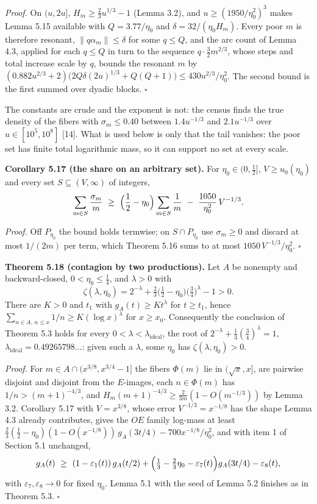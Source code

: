 \documentclass[11pt,a4paper]{article}
\begin{document}
\emph{Proof.} On \((u,2u]\), \(H_m\ge\tfrac23u^{1/3}-1\) (Lemma 3.2),
and \(u\ge(1950/\eta_0^2)^3\) makes Lemma 5.15 available with
\(Q=3.77/\eta_0\) and \(\delta=32/(\eta_0H_m)\). Every poor \(m\) is
therefore resonant, \(\|q\alpha_m\|\le\delta\) for some \(q\le Q\), and
the arc count of Lemma 4.3, applied for each \(q\le Q\) in turn to the
sequence \(q\cdot\tfrac32m^{2/3}\), whose steps and total increase scale
by \(q\), bounds the resonant \(m\) by
\((0.882u^{2/3}+2)\bigl(2Q\delta(2u)^{1/3}+Q(Q+1)\bigr)\le430u^{2/3}/\eta_0^2\).
The second bound is the first summed over dyadic blocks. \(\square\)

The constants are crude and the exponent is not: the census finds the
true density of the fibers with \(\sigma_m\le0.40\) between
\(1.4u^{-1/3}\) and \(2.1u^{-1/3}\) over \(u\in[10^5,10^8]\) {[}14{]}.
What is used below is only that the tail vanishes: the poor set has
finite total logarithmic mass, so it can support no set at every scale.

\textbf{Corollary 5.17 (the share on an arbitrary set).} For
\(\eta_0\in(0,\tfrac12]\), \(V\ge u_0(\eta_0)\) and every set
\(S\subseteq(V,\infty)\) of integers, \[
\sum_{m\in S}\frac{\sigma_m}{m}\ \ge\ \Bigl(\frac12-\eta_0\Bigr)\sum_{m\in S}\frac1m\ -\ \frac{1050}{\eta_0^2}\,V^{-1/3}.
\]

\emph{Proof.} Off \(P_{\eta_0}\) the bound holds termwise; on
\(S\cap P_{\eta_0}\) use \(\sigma_m\ge0\) and discard at most \(1/(2m)\)
per term, which Theorem 5.16 sums to at most
\(1050\,V^{-1/3}/\eta_0^2\). \(\square\)

\textbf{Theorem 5.18 (contagion by two productions).} Let \(A\) be
nonempty and backward-closed, \(0<\eta_0\le\tfrac14\), and \(\lambda>0\)
with \[
\zeta(\lambda,\eta_0)=2^{-\lambda}+\tfrac23\bigl(\tfrac12-\eta_0\bigr)\bigl(\tfrac34\bigr)^{\lambda}-1>0.
\] There are \(K>0\) and \(t_1\) with \(g_A(t)\ge Kt^{\lambda}\) for
\(t\ge t_1\), hence \(\sum_{n\in A,\,n\le x}1/n\ge K(\log x)^\lambda\)
for \(x\ge x_0\). Consequently the conclusion of Theorem 5.3 holds for
every \(0<\lambda<\lambda_{\mathrm{ideal}}\), the root of
\(2^{-\lambda}+\tfrac13(\tfrac34)^\lambda=1\),
\(\lambda_{\mathrm{ideal}}=0.49265798\ldots\): given such a \(\lambda\),
some \(\eta_0\) has \(\zeta(\lambda,\eta_0)>0\).

\emph{Proof.} For \(m\in A\cap(x^{3/8},x^{3/4}-1]\) the fibers
\(\Phi(m)\) lie in \((\sqrt x,x]\), are pairwise disjoint and disjoint
from the \(E\)-images, each \(n\in\Phi(m)\) has \(1/n>(m+1)^{-4/3}\),
and \(H_m(m+1)^{-4/3}\ge\tfrac2{3m}(1-O(m^{-1/3}))\) by Lemma 3.2.
Corollary 5.17 with \(V=x^{3/8}\), whose error \(V^{-1/3}=x^{-1/8}\) has
the shape Lemma 4.3 already contributes, gives the \(OE\) family
log-mass at least
\(\tfrac23(\tfrac12-\eta_0)(1-O(x^{-1/8}))\,g_A(3t/4)-700x^{-1/8}/\eta_0^2\),
and with item 1 of Section 5.1 unchanged, \[
g_A(t)\ \ge\ (1-\varepsilon_1(t))\,g_A(t/2)
+\Bigl(\tfrac13-\tfrac23\eta_0-\varepsilon_7(t)\Bigr)g_A(3t/4)-\varepsilon_8(t),
\] with \(\varepsilon_7,\varepsilon_8\to0\) for fixed \(\eta_0\). Lemma
5.1 with the seed of Lemma 5.2 finishes as in Theorem 5.3. \(\square\)
\end{document}
